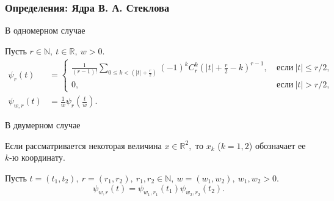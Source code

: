 \documentclass[pdf, 9pt, unicode]{beamer} %
\renewcommand{\alert}[1]{{\usebeamercolor[fg]{bluetext_color}#1}}
\begin{document}
\begin{frame}
  \frametitle{Определения: Ядра В. А. Стеклова}

\begin{block}{В одномерном случае}

    Пусть $ r\in \mathbb{N},\ t\in\mathbb{R},\ w>0.$ 
    \begin{align*}
      \psi_r(t)&=
      \begin{cases}
        \frac{1}{(r-1)!}\sum\limits_{0\leqslant k<\left(|t|+\frac{r}{2}\right)}(-1)^kC_r^k\left(|t|+\frac{r}{2}-k\right)^{r-1},&\ \text{если}\ |t|\leqslant r/2,\\
        0,&\ \text{если}\ |t| > r/2,
      \end{cases} \\
      \psi_{w,r}(t)&=\frac{1}{w}\psi_r\left(\frac{t}{w}\right).
    \end{align*}
\end{block}

\begin{block}{В двумерном случае}

    Если рассматривается некоторая величина $x\in\mathbb{R}^2,$ то
    $x_k$ ($k=1,2$) обозначает ее $k$-ю координату.
 
    Пусть $t=(t_1,t_2),\ r=(r_1,r_2),\ r_1,r_2 \in \mathbb{N},\  w = (w_1,w_2),\ w_1,w_2 > 0.$
    \begin{equation*}
      \psi_{w,r}(t)=\psi_{w_1,r_1}(t_1)\psi_{w_2,r_2}(t_2).
    \end{equation*}
\end{block}

\end{frame}
\end{document}
